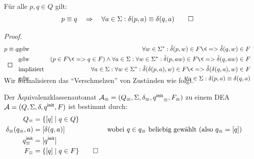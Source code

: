 \begin{lemma}
\label{eqn:delta-wohldefiniert}
Für alle $p,q\in Q$ gilt:
        \[
        p \equiv q \quad\=>\quad \forall a\in\Sigma: \delta(p,a)\equiv\delta(q,a)
        \qedhere
        \]
\end{lemma}
\begin{proof}
\begin{eqnarray*}
        p \equiv q  
        & \text{gdw} & \forall w\in\Sigma^*: \tilde\delta(p,w)\in F \<=> \tilde\delta(q,w) \in F\\
        & \text{gdw} & (p\in F \<=> q \in F) \land \forall a\in \Sigma: \forall w\in\Sigma^*:
        \tilde\delta(p,aw)\in F \<=> \tilde\delta(q,aw)\in F\\
        &\text{impliziert} &  \forall a\in\Sigma: \forall w\in\Sigma^*: \tilde\delta(\delta(p,a),w)\in F \<=> \tilde\delta(\delta(q,a),w)\in F\\
        & \text{gdw} & \forall a\in\Sigma: \delta(p,a)\equiv\delta(q,a)
        \qedherefixeqnarray
\end{eqnarray*}
\end{proof}
Wir formalisieren das "`Verschmelzen"' von Zuständen wie folgt.
\begin{Def}[name={[Äquivalenzklassenautomat]}]
        Der Äquivalenzklassenautomat $\mathcal{A}_\equiv=(Q_\equiv,\Sigma,\delta_\equiv,{q^\mathsf{init}}_\equiv,F_\equiv)$ zu einem \acs*{DEA} $\mathcal{A}=(Q,\Sigma,\delta,q^\mathsf{init},F)$ ist bestimmt durch:
        \begin{align*}
          Q_\equiv &= \{[q]\mid q\in Q\} \\
          \delta_\equiv(q_\equiv,a) &= [\delta(q,a)] & \text{ wobei }q\in q_\equiv \text{ beliebig gewählt } & (\text{also }q_\equiv = [q])\\
          q^\mathsf{init}_\equiv &= [q^\mathsf{init}] \\
          F_\equiv & =\{[q]\mid q\in F \}
                     \qedhere
        \end{align*}
\end{Def}

